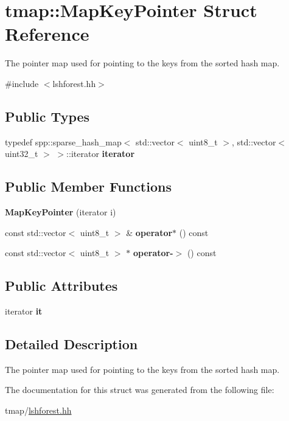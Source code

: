 \hypertarget{structtmap_1_1MapKeyPointer}{}\section{tmap\+:\+:Map\+Key\+Pointer Struct Reference}
\label{structtmap_1_1MapKeyPointer}


The pointer map used for pointing to the keys from the sorted hash map.  




{\ttfamily \#include $<$lshforest.\+hh$>$}

\subsection*{Public Types}
\begin{DoxyCompactItemize}
\item 
\mbox{\label{structtmap_1_1MapKeyPointer_a236dc7396d6a4dca2a942196aa536f56}} 
typedef spp\+::sparse\+\_\+hash\+\_\+map$<$ std\+::vector$<$ uint8\+\_\+t $>$, std\+::vector$<$ uint32\+\_\+t $>$ $>$\+::iterator {\bfseries iterator}
\end{DoxyCompactItemize}
\subsection*{Public Member Functions}
\begin{DoxyCompactItemize}
\item 
\mbox{\label{structtmap_1_1MapKeyPointer_ac96f2c30e0923aa2b24674d1d0a8951f}} 
{\bfseries Map\+Key\+Pointer} (iterator i)
\item 
\mbox{\label{structtmap_1_1MapKeyPointer_ade7f29bcf8ac9ec5875f1152d50912e4}} 
const std\+::vector$<$ uint8\+\_\+t $>$ \& {\bfseries operator$\ast$} () const
\item 
\mbox{\label{structtmap_1_1MapKeyPointer_ab681e8610b86e353af4feb6ea0ef8a9a}} 
const std\+::vector$<$ uint8\+\_\+t $>$ $\ast$ {\bfseries operator-\/$>$} () const
\end{DoxyCompactItemize}
\subsection*{Public Attributes}
\begin{DoxyCompactItemize}
\item 
\mbox{\label{structtmap_1_1MapKeyPointer_a7e5f9fcf74a41f693afd2a727a2997d5}} 
iterator {\bfseries it}
\end{DoxyCompactItemize}


\subsection{Detailed Description}
The pointer map used for pointing to the keys from the sorted hash map. 

The documentation for this struct was generated from the following file\+:\begin{DoxyCompactItemize}
\item 
tmap/\hyperlink{lshforest_8hh}{lshforest.\+hh}\end{DoxyCompactItemize}
